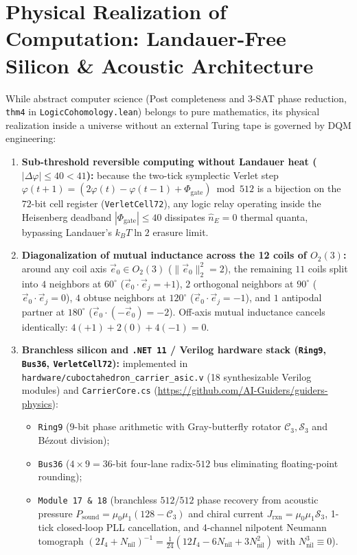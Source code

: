 \documentclass[11pt,a4paper]{article}
\theoremstyle{definition}
\theoremstyle{remark}
\begin{document}
\section{Physical Realization of Computation: Landauer-Free Silicon \& Acoustic Architecture}
\label{sec:silicon-hardware}

While abstract computer science (Post completeness and 3-SAT phase reduction, \texttt{thm4} in \texttt{LogicCohomology.lean}) belongs to pure mathematics, its physical realization inside a universe without an external Turing tape is governed by DQM engineering:
\begin{enumerate}[label=\textbf{\arabic*.},leftmargin=*]
\item \textbf{Sub-threshold reversible computing without Landauer heat ($|\Delta\varphi|\le 40 < 41$):}
  because the two-tick symplectic Verlet step $\varphi(t+1) = (2\varphi(t) - \varphi(t-1) + \Phi_{\mathrm{gate}})\bmod 512$ is a bijection on the $72$-bit cell register (\texttt{VerletCell72}), any logic relay operating inside the Heisenberg deadband $|\Phi_{\mathrm{gate}}|\le 40$ dissipates $\hat{n}_E = 0$ thermal quanta, bypassing Landauer's $k_B T\ln 2$ erasure limit.
\item \textbf{Diagonalization of mutual inductance across the 12 coils of $O_2(3)$:}
  around any coil axis $\vec{e}_0\in O_2(3)$ ($\|\vec{e}_0\|_2^2 = 2$), the remaining $11$ coils split into $4$ neighbors at $60^\circ$ ($\vec{e}_0\cdot\vec{e}_j = +1$), $2$ orthogonal neighbors at $90^\circ$ ($\vec{e}_0\cdot\vec{e}_j = 0$), $4$ obtuse neighbors at $120^\circ$ ($\vec{e}_0\cdot\vec{e}_j = -1$), and $1$ antipodal partner at $180^\circ$ ($\vec{e}_0\cdot(-\vec{e}_0) = -2$). Off-axis mutual inductance cancels identically: $4(+1) + 2(0) + 4(-1) = 0$.
\item \textbf{Branchless silicon and \texttt{.NET~11} / Verilog hardware stack (\texttt{Ring9}, \texttt{Bus36}, \texttt{VerletCell72}):}
  implemented in \texttt{hardware/cuboctahedron\_carrier\_asic.v} (18 synthesizable Verilog modules) and \texttt{CarrierCore.cs} (\url{https://github.com/AI-Guiders/guiders-physics}):
  \begin{itemize}[noitemsep]
  \item \texttt{Ring9} ($9$-bit phase arithmetic with Gray-butterfly rotator $\mathcal{C}_3,\mathcal{S}_3$ and Bézout division);
  \item \texttt{Bus36} ($4\times 9 = 36$-bit four-lane radix-$512$ bus eliminating floating-point rounding);
  \item \texttt{Module~17 \& 18} (branchless $512/512$ phase recovery from acoustic pressure $P_{\mathrm{sound}} = \mu_0\mu_1(128-\mathcal{C}_3)$ and chiral current $J_{\mathrm{rxn}} = \mu_0\mu_1\mathcal{S}_3$, 1-tick closed-loop PLL cancellation, and 4-channel nilpotent Neumann tomograph $(2I_4 + N_{\mathrm{nil}})^{-1} = \frac{1}{24}(12 I_4 - 6 N_{\mathrm{nil}} + 3 N_{\mathrm{nil}}^2)$ with $N_{\mathrm{nil}}^3 \equiv 0$).
  \end{itemize}
\end{enumerate}
\end{document}

